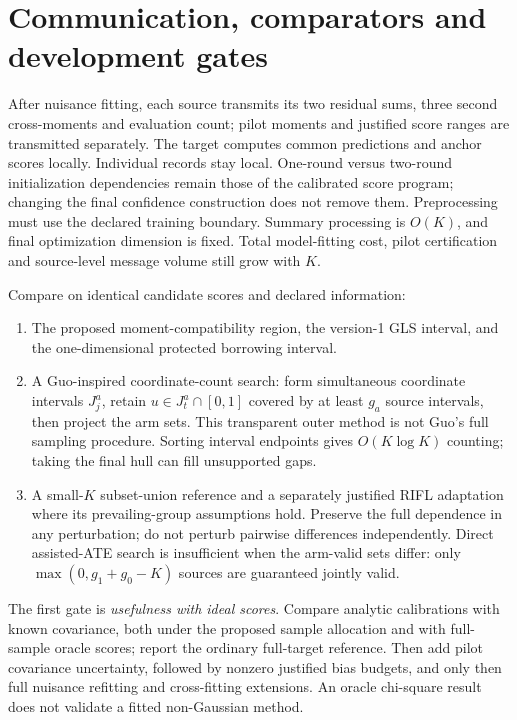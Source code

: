 \section{Communication, comparators and development gates}

After nuisance fitting, each source transmits its two residual sums, three
second cross-moments and evaluation count; pilot moments and justified score
ranges are transmitted separately. The target computes common predictions
and anchor scores locally. Individual records stay local. One-round versus
two-round initialization dependencies remain those of the calibrated score
program; changing the final confidence construction does not remove them.
Preprocessing must use the declared training boundary. Summary processing
is $O(K)$, and final optimization dimension is fixed. Total model-fitting
cost, pilot certification and source-level message volume still grow with $K$.

Compare on identical candidate scores and declared information:
\begin{enumerate}
\item The proposed moment-compatibility region, the version-1 GLS interval,
and the one-dimensional protected borrowing interval.
\item A Guo-inspired coordinate-count search: form simultaneous coordinate
intervals $J_j^a$, retain $u\in J_t^a\cap[0,1]$ covered by at least $g_a$
source intervals, then project the arm sets. This transparent outer method
is not Guo's full sampling procedure. Sorting interval endpoints gives
$O(K\log K)$ counting; taking the final hull can fill unsupported gaps.
\item A small-$K$ subset-union reference and a separately justified RIFL
adaptation where its prevailing-group assumptions hold. Preserve the full
dependence in any perturbation; do not perturb pairwise differences
independently. Direct assisted-ATE search is insufficient when the arm-valid
sets differ: only $\max(0,g_1+g_0-K)$ sources are guaranteed jointly valid.
\end{enumerate}

The first gate is \emph{usefulness with ideal scores}. Compare analytic
calibrations with known covariance, both under the proposed sample allocation
and with full-sample oracle scores; report the ordinary full-target reference.
Then add pilot covariance uncertainty, followed by nonzero justified bias
budgets, and only then full nuisance refitting and cross-fitting extensions.
An oracle chi-square result does not validate a fitted non-Gaussian method.

